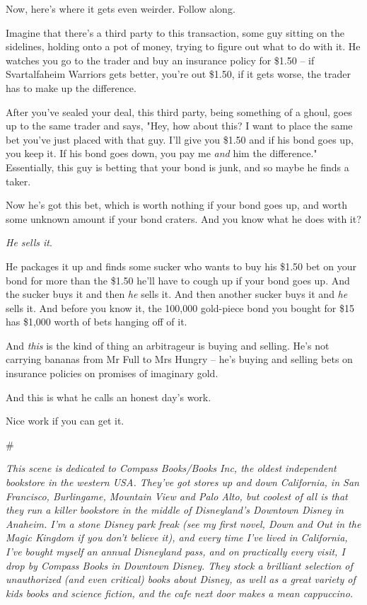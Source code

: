 Now, here's where it gets even weirder. Follow along.

Imagine that there's a third party to this transaction, some guy
sitting on the sidelines, holding onto a pot of money, trying to
figure out what to do with it. He watches you go to the trader and
buy an insurance policy for \$1.50 -- if Svartalfaheim Warriors
gets better, you're out \$1.50, if it gets worse, the trader has to
make up the difference.

After you've sealed your deal, this third party, being something of
a ghoul, goes up to the same trader and says, "Hey, how about this?
I want to place the same bet you've just placed with that guy. I'll
give you \$1.50 and if his bond goes up, you keep it. If his bond
goes down, you pay me \emph{and} him the difference." Essentially,
this guy is betting that your bond is junk, and so maybe he finds a
taker.

Now he's got this bet, which is worth nothing if your bond goes up,
and worth some unknown amount if your bond craters. And you know
what he does with it?

\emph{He sells it}.

He packages it up and finds some sucker who wants to buy his \$1.50
bet on your bond for more than the \$1.50 he'll have to cough up if
your bond goes up. And the sucker buys it and then \emph{he} sells
it. And then another sucker buys it and \emph{he} sells it. And
before you know it, the 100,000 gold-piece bond you bought for \$15
has \$1,000 worth of bets hanging off of it.

And \emph{this} is the kind of thing an arbitrageur is buying and
selling. He's not carrying bananas from Mr Full to Mrs Hungry --
he's buying and selling bets on insurance policies on promises of
imaginary gold.

And this is what he calls an honest day's work.

Nice work if you can get it.

\#

\emph{This scene is dedicated to Compass Books/Books Inc, the oldest independent bookstore in the western USA. They've got stores up and down California, in San Francisco, Burlingame, Mountain View and Palo Alto, but coolest of all is that they run a killer bookstore in the middle of Disneyland's Downtown Disney in Anaheim. I'm a stone Disney park freak (see my first novel, Down and Out in the Magic Kingdom if you don't believe it), and every time I've lived in California, I've bought myself an annual Disneyland pass, and on practically every visit, I drop by Compass Books in Downtown Disney. They stock a brilliant selection of unauthorized (and even critical) books about Disney, as well as a great variety of kids books and science fiction, and the cafe next door makes a mean cappuccino.}

